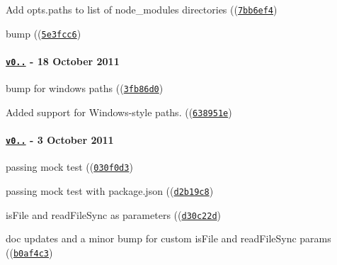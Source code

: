 \begin{DoxyItemize}
\item Add opts.\+paths to list of node\+\_\+modules directories ((\href{https://github.com/browserify/resolve/commit/7bb6ef4a1805523169f30b6ea38776796a714c3a}{\tt {\ttfamily 7bb6ef4}})
\item bump ((\href{https://github.com/browserify/resolve/commit/5e3fcc63cfec322779be5435820d3236e6d13dba}{\tt {\ttfamily 5e3fcc6}})
\end{DoxyItemize}

\paragraph*{\href{https://github.com/browserify/resolve/compare/v0.1.0...v0.1.1}{\tt v0..} -\/ 18 October 2011}


\begin{DoxyItemize}
\item bump for windows paths ((\href{https://github.com/browserify/resolve/commit/3fb86d07c77b09a7d6fa6d2a8b89432a070a6aa0}{\tt {\ttfamily 3fb86d0}})
\item Added support for Windows-\/style paths. ((\href{https://github.com/browserify/resolve/commit/638951ed92fa4435d9752df30c3bcb9eb49573cd}{\tt {\ttfamily 638951e}})
\end{DoxyItemize}

\paragraph*{\href{https://github.com/browserify/resolve/compare/v0.0.4...v0.1.0}{\tt v0..} -\/ 3 October 2011}


\begin{DoxyItemize}
\item passing mock test ((\href{https://github.com/browserify/resolve/commit/030f0d391e02558574bc673077fb1b4057f8358d}{\tt {\ttfamily 030f0d3}})
\item passing mock test with package.\+json ((\href{https://github.com/browserify/resolve/commit/d2b19c893b7f8c63154c5b5ff2c419ffdc8baa0c}{\tt {\ttfamily d2b19c8}})
\item is\+File and read\+File\+Sync as parameters ((\href{https://github.com/browserify/resolve/commit/d30c22d1e13b000016f2592d6d6f3489a2d29988}{\tt {\ttfamily d30c22d}})
\item doc updates and a minor bump for custom is\+File and read\+File\+Sync params ((\href{https://github.com/browserify/resolve/commit/b0af4c3ac1a51acf9995cb4e078bf5619f257952}{\tt {\ttfamily b0af4c3}})
\end{DoxyItemize}


